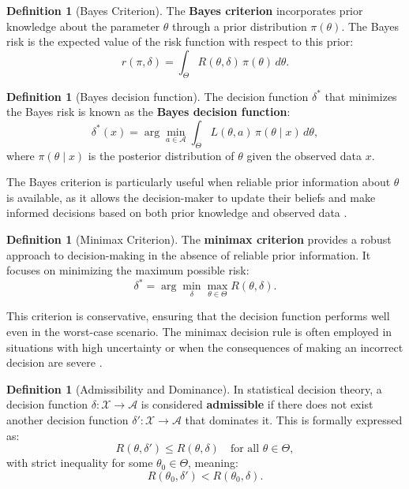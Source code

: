 \documentclass[magisterska, english]{pwr_wmat_praca_dyplomowa}
\theoremstyle{plain}
\numberwithin{theorem}{chapter}
\theoremstyle{definition}
\numberwithin{theorem}{chapter}
\newtheorem{definition}[theorem]{Definition}
\begin{document}
\begin{definition}[Bayes Criterion]
	The \textbf{Bayes criterion} incorporates prior knowledge about the parameter \( \theta \) through a prior distribution \( \pi(\theta) \). The Bayes risk is the expected value of the risk function with respect to this prior:
	\[
	r(\pi, \delta) = \int_{\Theta} R(\theta, \delta) \, \pi(\theta) \, d\theta.
	\]
\end{definition}
	
\begin{definition}[Bayes decision function]
	The decision function \( \delta^* \) that minimizes the Bayes risk is known as the \textbf{Bayes decision function}:
	\[
	\delta^*(x) = \arg \min_{a \in \mathcal{A}} \int_{\Theta} L(\theta, a) \, \pi(\theta \mid x) \, d\theta,
	\]
	where \( \pi(\theta \mid x) \) is the posterior distribution of \( \theta \) given the observed data \( x \).
\end{definition}



The Bayes criterion is particularly useful when reliable prior information about \( \theta \) is available, as it allows the decision-maker to update their beliefs and make informed decisions based on both prior knowledge and observed data \cite{Berger1985}.

\begin{definition}[Minimax Criterion]
	The \textbf{minimax criterion} provides a robust approach to decision-making in the absence of reliable prior information. It focuses on minimizing the maximum possible risk:
	\[
	\delta^* = \arg \min_{\delta} \max_{\theta \in \Theta} R(\theta, \delta).
	\]
\end{definition}

This criterion is conservative, ensuring that the decision function performs well even in the worst-case scenario. The minimax decision rule is often employed in situations with high uncertainty or when the consequences of making an incorrect decision are severe \cite{Wald1950}.

\begin{definition}[Admissibility and Dominance]
	
	In statistical decision theory, a decision function \( \delta: \mathcal{X} \rightarrow \mathcal{A} \) is considered \textbf{admissible} if there does not exist another decision function \( \delta': \mathcal{X} \rightarrow \mathcal{A} \) that dominates it. This is formally expressed as:
	\[
	R(\theta, \delta') \leq R(\theta, \delta) \quad \text{for all } \theta \in \Theta,
	\]
	with strict inequality for some \( \theta_0 \in \Theta \), meaning:
	\[
	R(\theta_0, \delta') < R(\theta_0, \delta).
	\]
\end{definition}
\end{document}
